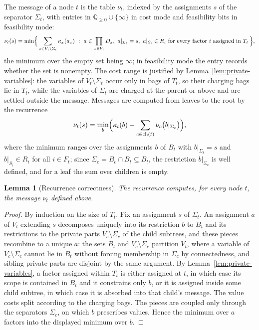 \documentclass[11pt]{article}
\theoremstyle{plain}
\newtheorem{lemma}[theorem]{Lemma}
\theoremstyle{definition}
\theoremstyle{remark}
\begin{document}
The message of a node \(t\) is the table \(\nu_t\), indexed by the
assignments \(s\) of the separator \(\Sigma_t\), with entries in
\(\mathbb Q_{\ge0}\cup\{\infty\}\) in cost mode and feasibility bits in
feasibility mode:
\[
  \nu_t(s)=\min\Bigl\{\,\sum_{x\in V_t\setminus\Sigma_t}\kappa_x(a_x)\ :\
  a\in\prod_{x\in V_t}D_x,\ a|_{\Sigma_t}=s,\ a|_{S_i}\in R_i\ \text{for
  every factor }i\text{ assigned in }T_t\,\Bigr\},
\]
the minimum over the empty set being \(\infty\); in feasibility mode the
entry records whether the set is nonempty.  The cost range is justified by
Lemma~\ref{lem:private-variables}: the variables of \(V_t\setminus\Sigma_t\)
occur only in bags of \(T_t\), so their charging bags lie in \(T_t\), while
the variables of \(\Sigma_t\) are charged at the parent or above and are
settled outside the message.  Messages are computed from leaves to the root
by the recurrence
\[
  \nu_t(s)=\min_{b}\Bigl(\kappa_t(b)+\sum_{c\in\mathrm{ch}(t)}
  \nu_c\bigl(b|_{\Sigma_c}\bigr)\Bigr),
\]
where the minimum ranges over the assignments \(b\) of \(B_t\) with
\(b|_{\Sigma_t}=s\) and \(b|_{S_i}\in R_i\) for all \(i\in F_t\); since
\(\Sigma_c=B_c\cap B_t\subseteq B_t\), the restriction \(b|_{\Sigma_c}\) is
well defined, and for a leaf the sum over children is empty.

\begin{lemma}[Recurrence correctness]
\label{lem:recurrence-correctness}
The recurrence computes, for every node \(t\), the message \(\nu_t\) defined
above.
\end{lemma}

\begin{proof}
By induction on the size of \(T_t\).  Fix an assignment \(s\) of
\(\Sigma_t\).  An assignment \(a\) of \(V_t\) extending \(s\) decomposes
uniquely into its restriction \(b\) to \(B_t\) and its restrictions to the
private parts \(V_c\setminus\Sigma_c\) of the child subtrees, and these
pieces recombine to a unique \(a\): the sets \(B_t\) and
\(V_c\setminus\Sigma_c\) partition \(V_t\), where a variable of
\(V_c\setminus\Sigma_c\) cannot lie in \(B_t\) without forcing membership
in \(\Sigma_c\) by connectedness, and sibling private parts are disjoint by
the same argument.  By Lemma~\ref{lem:private-variables}, a factor assigned
within \(T_t\) is either assigned at \(t\), in which case its scope is
contained in \(B_t\) and it constrains only \(b\), or it is assigned inside
some child subtree, in which case it is absorbed into that child's message.
The value costs split according to the charging bags.  The pieces are coupled
only through the separators \(\Sigma_c\), on which \(b\) prescribes values.
Hence the minimum over \(a\) factors into the displayed minimum over \(b\).
\end{proof}
\end{document}
